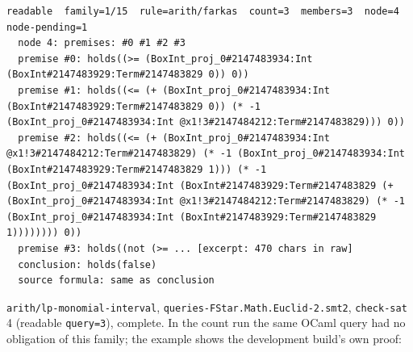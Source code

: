 \documentclass[10pt,a4paper]{article}
\begin{document}
\begin{lstlisting}[basicstyle=\ttfamily\footnotesize,breaklines=true,breakatwhitespace=false,columns=fullflexible,keepspaces=true,showstringspaces=false,breakindent=1.5em,postbreak=\mbox{\textcolor{gray}{$\hookrightarrow$}\space},frame=single,rulecolor=\color{lightgray},xleftmargin=2pt,xrightmargin=2pt,aboveskip=6pt,belowskip=6pt]
readable  family=1/15  rule=arith/farkas  count=3  members=3  node=4  node-pending=1
  node 4: premises: #0 #1 #2 #3
  premise #0: holds((>= (BoxInt_proj_0#2147483934:Int (BoxInt#2147483929:Term#2147483829 0)) 0))
  premise #1: holds((<= (+ (BoxInt_proj_0#2147483934:Int (BoxInt#2147483929:Term#2147483829 0)) (* -1 (BoxInt_proj_0#2147483934:Int @x1!3#2147484212:Term#2147483829))) 0))
  premise #2: holds((<= (+ (BoxInt_proj_0#2147483934:Int @x1!3#2147484212:Term#2147483829) (* -1 (BoxInt_proj_0#2147483934:Int (BoxInt#2147483929:Term#2147483829 1))) (* -1 (BoxInt_proj_0#2147483934:Int (BoxInt#2147483929:Term#2147483829 (+ (BoxInt_proj_0#2147483934:Int @x1!3#2147484212:Term#2147483829) (* -1 (BoxInt_proj_0#2147483934:Int (BoxInt#2147483929:Term#2147483829 1)))))))) 0))
  premise #3: holds((not (>= ... [excerpt: 470 chars in raw]
  conclusion: holds(false)
  source formula: same as conclusion
\end{lstlisting}

\texttt{arith/\allowbreak{}lp-{}\allowbreak{}monomial-{}\allowbreak{}interval}, \texttt{queries-{}\allowbreak{}FStar.\allowbreak{}Math.\allowbreak{}Euclid-{}\allowbreak{}2.\allowbreak{}smt2}, \texttt{check-{}\allowbreak{}sat} 4 (readable \texttt{query=\allowbreak{}3}), complete. In the count run the same OCaml query had no obligation of this family; the example shows the development build's own proof:
\end{document}
